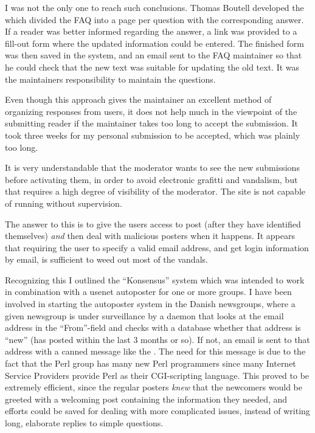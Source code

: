 I was not the only one to reach such conclusions.  Thomas Boutell
developed the  which divided the FAQ into a page per question with
the corresponding answer.  If a reader was better informed regarding
the answer, a link was provided to a fill-out form where the updated
information could be entered.  The finished form was then saved in the
system, and an email sent to the FAQ maintainer so that he could check
that the new text was suitable for updating the old text.  It was the
maintainers responsibility to maintain the questions.

Even though this approach gives the maintainer an excellent method of
organizing responses from users, it does not help much in the
viewpoint of the submitting reader if the maintainer takes too long to
accept the submission.  It took three weeks for my personal
submission to be accepted, which was plainly too long.

It is very understandable that the moderator wants to see the new
submissions before activating them, in order to avoid electronic
grafitti and vandalism, but that requires a high degree of visibility
of the moderator.  The site is not capable of running without
supervision.

The answer to this is to give the users access to post (after they
have identified themselves) \textit{and} then deal with malicious
posters when it happens.  It appears that requiring the user to
specify a valid email address, and get login information by email, is
sufficient to weed out most of the vandals.

Recognizing this I outlined the ``Konsensus'' system which was
intended to work in combination with a usenet autoposter for one or
more groups.  I have been involved in starting the autoposter system
in the Danish newsgroups, where a given newsgroup is under
surveillance by a daemon that looks at the email address in the
``From''-field and checks with a database whether that address is
``new'' (has posted within the last 3 months or so).  If not, an email
is sent to that address with a canned message like the
.  The need for this message is due to the fact that the Perl
group has many new Perl programmers since many Internet Service
Providers provide Perl as their CGI-scripting language.  This proved
to be extremely efficient, since the regular posters \textit{knew}
that the newcomers would be greeted with a welcoming post containing
the information they needed, and efforts could be saved for dealing
with more complicated issues, instead of writing long, elaborate
replies to simple questions.

